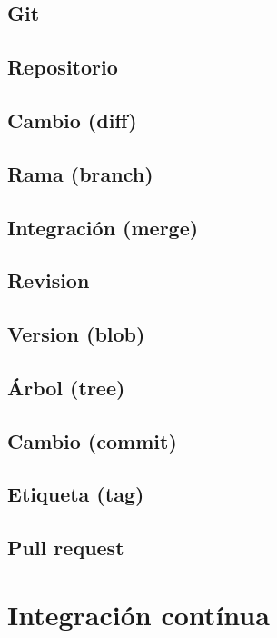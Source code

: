 \subsection{Git}
\subsection{Repositorio}
\subsection{Cambio (diff)}
\subsection{Rama (branch)}
\subsection{Integración (merge)}
\subsection{Revision}
\subsection{Version (blob)}
\subsection{Árbol (tree)}
\subsection{Cambio (commit)}
\subsection{Etiqueta (tag)}
\subsection{Pull request}
\section{Integración contínua}